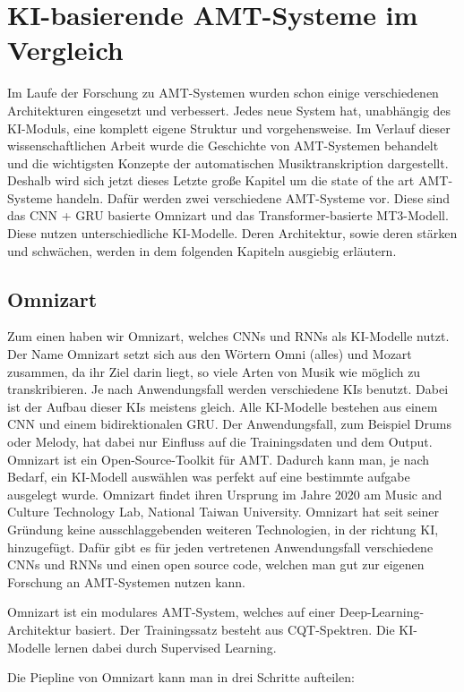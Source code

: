 \section{KI-basierende AMT-Systeme im Vergleich}
Im Laufe der Forschung zu AMT-Systemen wurden schon einige verschiedenen Architekturen eingesetzt und verbessert.
Jedes neue System hat, unabhängig des KI-Moduls, eine komplett eigene Struktur und vorgehensweise.
Im Verlauf dieser wissenschaftlichen Arbeit wurde die Geschichte von AMT-Systemen behandelt
und die wichtigsten Konzepte der automatischen Musiktranskription dargestellt.
Deshalb wird sich jetzt dieses Letzte große Kapitel um die state of the art AMT-Systeme handeln.
Dafür werden zwei verschiedene AMT-Systeme vor.
Diese sind das CNN + GRU basierte Omnizart und das Transformer-basierte MT3-Modell.
Diese nutzen unterschiedliche KI-Modelle.
Deren Architektur, sowie deren stärken und schwächen, werden in dem folgenden Kapiteln ausgiebig erläutern.

\subsection{Omnizart}
Zum einen haben wir Omnizart, welches CNNs und RNNs als KI-Modelle nutzt.
\cite{wu2021omnizart}
Der Name Omnizart setzt sich aus den Wörtern Omni (alles) und Mozart zusammen,
da ihr Ziel darin liegt, so viele Arten von Musik wie möglich zu transkribieren.
Je nach Anwendungsfall werden verschiedene KIs benutzt.
Dabei ist der Aufbau dieser KIs meistens gleich.
Alle KI-Modelle bestehen aus einem CNN und einem bidirektionalen GRU.
Der Anwendungsfall, zum Beispiel Drums oder Melody, hat dabei nur Einfluss auf die Trainingsdaten und dem Output.
Omnizart ist ein Open-Source-Toolkit für AMT.
Dadurch kann man, je nach Bedarf, ein KI-Modell auswählen was perfekt auf eine bestimmte aufgabe ausgelegt wurde.
Omnizart findet ihren Ursprung im Jahre 2020 am Music and Culture Technology Lab, National Taiwan University.
Omnizart hat seit seiner Gründung keine ausschlaggebenden weiteren Technologien, in der richtung KI, hinzugefügt.
Dafür gibt es für jeden vertretenen Anwendungsfall verschiedene CNNs und RNNs und einen open source code,
welchen man gut zur eigenen Forschung an AMT-Systemen nutzen kann.

Omnizart ist ein modulares AMT-System, welches auf einer Deep-Learning-Architektur basiert.
Der Trainingssatz besteht aus CQT-Spektren.
Die KI-Modelle lernen dabei durch Supervised Learning.

Die Piepline von Omnizart kann man in drei Schritte aufteilen:

